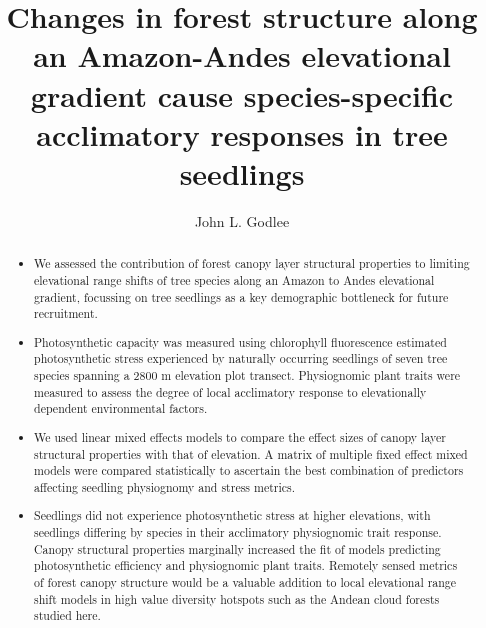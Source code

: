 \documentclass[a4paper, 11pt]{article}
\title{Changes in forest structure along an Amazon-Andes elevational gradient cause species-specific acclimatory responses in tree seedlings}
\author{John L. Godlee}
\begin{document}

\maketitle{}

\begin{abstract}
\noindent

\begin{itemize}
\item{We assessed the contribution of forest canopy layer structural properties to limiting elevational range shifts of tree species along an Amazon to Andes elevational gradient, focussing on tree seedlings as a key demographic bottleneck for future recruitment.}
\item{Photosynthetic capacity was measured using chlorophyll fluorescence estimated photosynthetic stress experienced by naturally occurring seedlings of seven tree species spanning a 2800 m elevation plot transect. Physiognomic plant traits were measured to assess the degree of local acclimatory response to elevationally dependent environmental factors.}
\item{We used linear mixed effects models to compare the effect sizes of canopy layer structural properties with that of elevation. A matrix of multiple fixed effect mixed models were compared statistically to ascertain the best combination of predictors affecting seedling physiognomy and stress metrics.}
\item{Seedlings did not experience photosynthetic stress at higher elevations, with seedlings differing by species in their acclimatory physiognomic trait response. Canopy structural properties marginally increased the fit of models predicting photosynthetic efficiency and physiognomic plant traits. Remotely sensed metrics of forest canopy structure would be a valuable addition to local elevational range shift models in high value diversity hotspots such as the Andean cloud forests studied here.}
\end{itemize}


\end{abstract}
\end{document}

